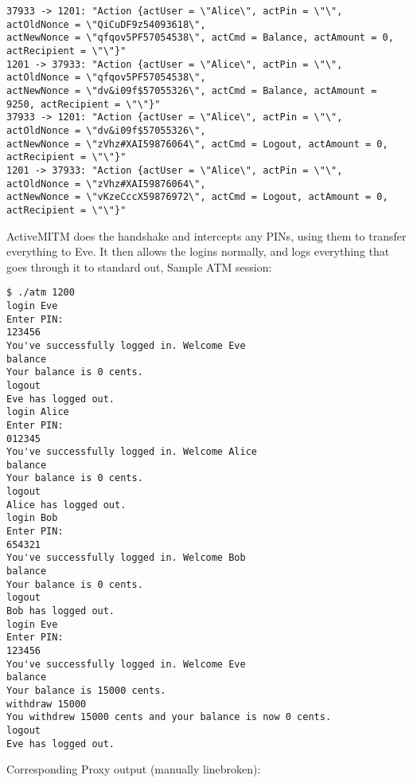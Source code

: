 \documentclass[12pt]{article}
\begin{document}
\begin{Verbatim}[frame=single,fontsize=\scriptsize]
37933 -> 1201: "Action {actUser = \"Alice\", actPin = \"\", actOldNonce = \"QiCuDF9z54093618\", 
actNewNonce = \"qfqov5PF57054538\", actCmd = Balance, actAmount = 0, actRecipient = \"\"}"
1201 -> 37933: "Action {actUser = \"Alice\", actPin = \"\", actOldNonce = \"qfqov5PF57054538\", 
actNewNonce = \"dv&i09f$57055326\", actCmd = Balance, actAmount = 9250, actRecipient = \"\"}"
37933 -> 1201: "Action {actUser = \"Alice\", actPin = \"\", actOldNonce = \"dv&i09f$57055326\", 
actNewNonce = \"zVhz#XAI59876064\", actCmd = Logout, actAmount = 0, actRecipient = \"\"}"
1201 -> 37933: "Action {actUser = \"Alice\", actPin = \"\", actOldNonce = \"zVhz#XAI59876064\", 
actNewNonce = \"vKzeCccX59876972\", actCmd = Logout, actAmount = 0, actRecipient = \"\"}"
\end{Verbatim}
ActiveMITM does the handshake and intercepts any PINs, using them to transfer everything to Eve.
It then allows the logins normally, and logs everything that goes through it to standard out,
Sample ATM session:
\begin{Verbatim}[frame=single,fontsize=\scriptsize]
$ ./atm 1200
login Eve
Enter PIN:
123456
You've successfully logged in. Welcome Eve
balance
Your balance is 0 cents.
logout
Eve has logged out.
login Alice
Enter PIN:
012345
You've successfully logged in. Welcome Alice
balance
Your balance is 0 cents.
logout
Alice has logged out.
login Bob
Enter PIN:
654321
You've successfully logged in. Welcome Bob
balance
Your balance is 0 cents.
logout
Bob has logged out.
login Eve
Enter PIN:
123456
You've successfully logged in. Welcome Eve
balance
Your balance is 15000 cents.
withdraw 15000
You withdrew 15000 cents and your balance is now 0 cents.
logout
Eve has logged out.
\end{Verbatim}
Corresponding Proxy output (manually linebroken):
\end{document}
